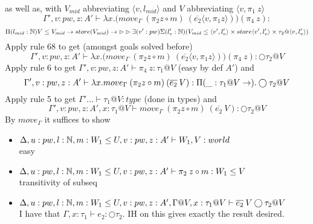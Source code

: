 \message{ !name(paper.tex)}\documentclass{article}
\begin{document}
\begin{itemize}
\begin{itemize}
\begin{itemize}
    as well as, with $V_{mid}$ abbreviating $\langle v, l_{mid} \rangle$ and $V$ abbreviating $\langle v, \pi_1 \: z \rangle$
    \[\Gamma', v: pw, z:A'  \vdash \lambda x. \big(move_{\Gamma} \: (\pi_2 z \circ m) \: (\overline{e_2}\langle v,  \pi_1 z \rangle) \big) (\pi_4 \: z) :\] 
    \[\Pi(l_{mid} : \mathbb{N}) V \leq V_{mid} \rightarrow store(V_{mid}) \rightarrow \rhd \rhd 
    \exists(v': pw)\Sigma(l_v' : \mathbb{N})(V_{mid} \leq \langle v', l_v' \rangle \times store\langle v', l_v' \rangle \times \tau_2 @ \langle v, l_v' \rangle)\]
    Apply rule 68 to get (amongst goals solved before)
        \[\Gamma', v: pw, z:A'  \vdash \lambda x. \big(move_{\Gamma} \: (\pi_2 z \circ m) \: (\overline{e_2}\langle v,  \pi_1 z \rangle) \big) (\pi_4 \: z) : \bigcirc \tau_2 @ V\] 
    Apply rule 6 to get  $\Gamma', v: pw, z:A'  \vdash \pi_4 \: z : \tau_1 @ V$ (easy by def $A'$) and
    \[\Gamma', v: pw, z:A' \vdash \lambda x. move_{\Gamma} \: (\pi_2 z \circ m) \: (\overline{e_2} \:V) :
    \Pi(\_ : \tau_1 @ V \rightarrow ).\bigcirc \tau_2 @ V
    \] 
    Apply rule 5 to get $\Gamma' \dots \vdash  \tau_1 @ V : type$ (done in types) and 
    \[\Gamma', v: pw, z:A', x: \tau_1 @ V \vdash move_{\Gamma} \: (\pi_2 z \circ m) \: (\overline{e_2} \:V) : \bigcirc \tau_2 @ V\]
    By $move_{\Gamma}$ it suffices to show
    \begin{itemize}
        \item $\Delta, u: pw, l: \mathbb{N}, m: W_1 \leq U, v: pw, z:A' \vdash W_1, V: world$\\
        easy
        \item $\Delta, u: pw, l: \mathbb{N}, m: W_1 \leq U, v: pw, z:A' \vdash \pi_2 \: z \circ m : W_1 \leq V$\\
        transitivity of subseq
        \item $\Delta, u: pw, l: \mathbb{N}, m: W_1 \leq U, v: pw, z:A', \Gamma @ V, x: \tau_1 @V \vdash \overline{e_2} \:V\bigcirc \tau_2 @ V$\\
        I have that $\Gamma, x: \tau_1 \vdash e_2 : \bigcirc \tau_2$. IH on this gives exactly the result desired.
    \end{itemize}
    

\end{itemize}
\end{itemize}
\end{itemize}
\end{document}
